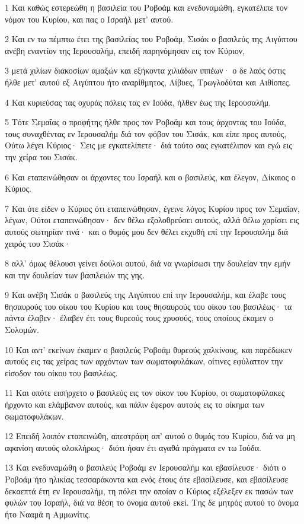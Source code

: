 \par 1 Και καθώς εστερεώθη η βασιλεία του Ροβοάμ και ενεδυναμώθη, εγκατέλιπε τον νόμον του Κυρίου, και πας ο Ισραήλ μετ' αυτού.
\par 2 Και εν τω πέμπτω έτει της βασιλείας του Ροβοάμ, Σισάκ ο βασιλεύς της Αιγύπτου ανέβη εναντίον της Ιερουσαλήμ, επειδή παρηνόμησαν εις τον Κύριον,
\par 3 μετά χιλίων διακοσίων αμαξών και εξήκοντα χιλιάδων ιππέων· ο δε λαός όστις ήλθε μετ' αυτού εξ Αιγύπτου ήτο αναρίθμητος, Λίβυες, Τρωγλοδύται και Αιθίοπες.
\par 4 Και κυριεύσας τας οχυράς πόλεις τας εν Ιούδα, ήλθεν έως της Ιερουσαλήμ.
\par 5 Τότε Σεμαΐας ο προφήτης ήλθε προς τον Ροβοάμ και τους άρχοντας του Ιούδα, τους συναχθέντας εν Ιερουσαλήμ διά τον φόβον του Σισάκ, και είπε προς αυτούς, Ούτω λέγει Κύριος· Σεις με εγκατελίπετε· διά τούτο σας εγκατέλιπον και εγώ εις την χείρα του Σισάκ.
\par 6 Και εταπεινώθησαν οι άρχοντες του Ισραήλ και ο βασιλεύς, και έλεγον, Δίκαιος ο Κύριος.
\par 7 Και ότε είδεν ο Κύριος ότι εταπεινώθησαν, έγεινε λόγος Κυρίου προς τον Σεμαΐαν, λέγων, Ούτοι εταπεινώθησαν· δεν θέλω εξολοθρεύσει αυτούς, αλλά θέλω χαρίσει εις αυτούς σωτηρίαν τινά· και ο θυμός μου δεν θέλει εκχυθή επί την Ιερουσαλήμ διά χειρός του Σισάκ·
\par 8 αλλ' όμως θέλουσι γείνει δούλοι αυτού, διά να γνωρίσωσι την δουλείαν την εμήν και την δουλείαν των βασιλειών της γης.
\par 9 Και ανέβη Σισάκ ο βασιλεύς της Αιγύπτου επί την Ιερουσαλήμ, και έλαβε τους θησαυρούς του οίκου του Κυρίου και τους θησαυρούς του οίκου του βασιλέως· τα πάντα έλαβεν· έλαβεν έτι τους θυρεούς τους χρυσούς, τους οποίους έκαμεν ο Σολομών.
\par 10 Και αντ' εκείνων έκαμεν ο βασιλεύς Ροβοάμ θυρεούς χαλκίνους, και παρέδωκεν αυτούς εις τας χείρας των αρχόντων των σωματοφυλάκων, οίτινες εφύλαττον την είσοδον του οίκου του βασιλέως.
\par 11 Και οπότε εισήρχετο ο βασιλεύς εις τον οίκον του Κυρίου, οι σωματοφύλακες ήρχοντο και ελάμβανον αυτούς, και πάλιν έφερον αυτούς εις το οίκημα των σωματοφυλάκων.
\par 12 Επειδή λοιπόν εταπεινώθη, απεστράφη απ' αυτού ο θυμός του Κυρίου, διά να μη αφανίση αυτούς ολοκλήρως· διότι ήσαν έτι αγαθά πράγματα εν τω Ιούδα.
\par 13 Και ενεδυναμώθη ο βασιλεύς Ροβοάμ εν Ιερουσαλήμ και εβασίλευσε· διότι ο Ροβοάμ ήτο ηλικίας τεσσαράκοντα και ενός έτους ότε εβασίλευσε, και εβασίλευσε δεκαεπτά έτη εν Ιερουσαλήμ, τη πόλει την οποίαν ο Κύριος εξέλεξεν εκ πασών των φυλών του Ισραήλ, διά να θέση το όνομα αυτού εκεί. Της δε μητρός αυτού το όνομα ήτο Νααμά η Αμμωνίτις.
